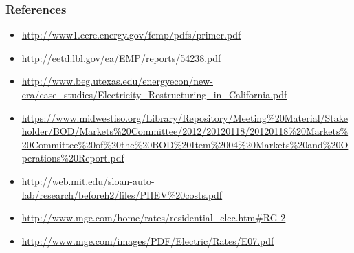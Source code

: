 
%

\subsubsection{References}
\begin{itemize}
\item \url{http://www1.eere.energy.gov/femp/pdfs/primer.pdf}\\
\item \url{http://eetd.lbl.gov/ea/EMP/reports/54238.pdf}\\
\item \url{http://www.beg.utexas.edu/energyecon/new-era/case_studies/Electricity_Restructuring_in_California.pdf}\\
\item \url{https://www.midwestiso.org/Library/Repository/Meeting\%20Material/Stakeholder/BOD/Markets\%20Committee/2012/20120118/20120118\%20Markets\%20Committee\%20of\%20the\%20BOD\%20Item\%2004\%20Markets\%20and\%20Operations\%20Report.pdf}
\item \url{http://web.mit.edu/sloan-auto-lab/research/beforeh2/files/PHEV\%20costs.pdf}\\
\item \url{http://www.mge.com/home/rates/residential_elec.htm#RG-2}
\item \url{http://www.mge.com/images/PDF/Electric/Rates/E07.pdf}
\end{itemize}


%




